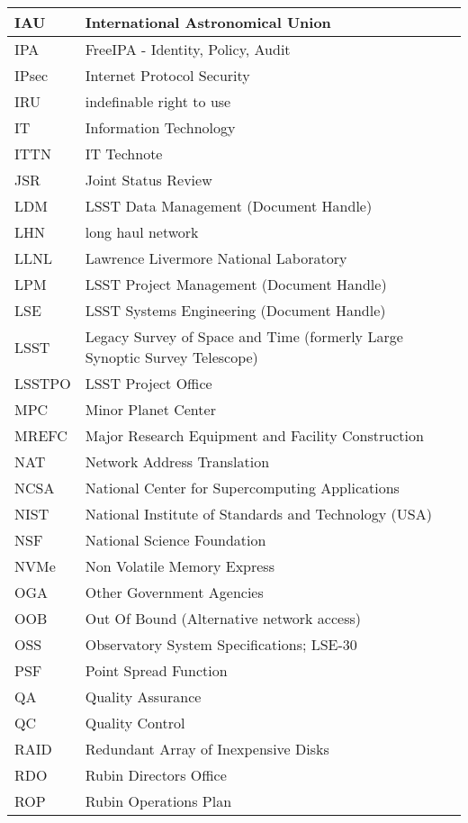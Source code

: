 \begin{longtable}{p{}p{}}
IAU & International Astronomical Union \\\hline
IPA & FreeIPA - Identity, Policy, Audit \\\hline
IPsec & Internet Protocol Security \\\hline
IRU & indefinable right to use \\\hline
IT & Information Technology \\\hline
ITTN & IT Technote \\\hline
JSR & Joint Status Review \\\hline
LDM & LSST Data Management (Document Handle) \\\hline
LHN & long haul network \\\hline
LLNL & Lawrence Livermore National Laboratory \\\hline
LPM & LSST Project Management (Document Handle) \\\hline
LSE & LSST Systems Engineering (Document Handle) \\\hline
LSST & Legacy Survey of Space and Time (formerly Large Synoptic Survey Telescope) \\\hline
LSSTPO & LSST Project Office \\\hline
MPC & Minor Planet Center \\\hline
MREFC & Major Research Equipment and Facility Construction \\\hline
NAT & Network Address Translation \\\hline
NCSA & National Center for Supercomputing Applications \\\hline
NIST & National Institute of Standards and Technology (USA) \\\hline
NSF & National Science Foundation \\\hline
NVMe & Non Volatile Memory Express \\\hline
OGA & Other Government Agencies \\\hline
OOB & Out Of Bound (Alternative network access) \\\hline
OSS & Observatory System Specifications; LSE-30 \\\hline
PSF & Point Spread Function \\\hline
QA & Quality Assurance \\\hline
QC & Quality Control \\\hline
RAID & Redundant Array of Inexpensive Disks \\\hline
RDO & Rubin Directors Office \\\hline
ROP & Rubin Operations Plan \\\hline

\end{longtable}
